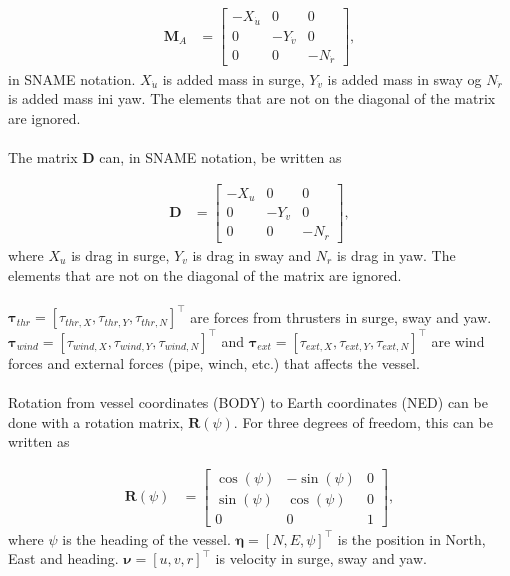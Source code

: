 \documentclass[a4paper]{article}
\begin{document}
\begin{equation}
\label{eq:MA_matrix}
\begin{aligned}
	\boldsymbol{M}_A &=
		\left[ \begin{array}{ccc}
			-X_{\dot{u}} &  0 & 0 \\
			0 &  -Y_{\dot{v}} & 0 \\
			0 & 0 &  -N_{\dot{r}} 
		\end{array} \right],
\end{aligned}
\end{equation}
%
in SNAME notation. $X_{\dot{u}}$ is added mass in surge, $Y_{\dot{v}}$ is added mass in sway og $N_{\dot{r}}$ is added mass ini yaw. The elements that are not on
the diagonal of the matrix are ignored.
\\
\\
The matrix $\boldsymbol{D}$ can, in SNAME notation, be written as

\begin{equation}
\label{eq:D_matrise}
\begin{aligned}
	\boldsymbol{D} &=
		\left[ \begin{array}{ccc}
			-X_u &  0 & 0 \\
			0 &  -Y_v & 0 \\
			0 & 0 &  -N_r 
		\end{array} \right],
\end{aligned}
\end{equation}
%
where $X_u$ is drag in surge, $Y_v$ is drag in sway and $N_r$ is drag in yaw. The elements that are not on the diagonal of the matrix are ignored.
\\
\\
$\boldsymbol{\tau}_{thr} = [\tau_{thr,X}, \tau_{thr,Y}, \tau_{thr,N}]^{\top}$ are forces from thrusters in surge, sway and yaw. 
$\boldsymbol{\tau}_{wind} = [\tau_{wind,X}, \tau_{wind,Y}, \tau_{wind,N}]^{\top}$ and $\boldsymbol{\tau}_{ext} =
 [\tau_{ext,X}, \tau_{ext,Y}, \tau_{ext,N}]^{\top}$ are wind forces and external forces (pipe, winch, etc.) that affects the vessel.
\\
\\
Rotation from vessel coordinates (BODY) to Earth coordinates (NED) can be done with a rotation matrix, $\boldsymbol{R}(\psi)$. For three degrees of freedom, this can be written as

\begin{equation}
\label{eq:rotation_matrix}
\begin{aligned}
	\boldsymbol{R}(\psi) &=
		\left[ \begin{array}{ccc}
			\cos(\psi) &  -\sin(\psi) & 0 \\
			\sin(\psi) &  \cos(\psi) & 0 \\
			0 & 0 &  1 
		\end{array} \right],
\end{aligned}
\end{equation}
%
where $\psi$ is the heading of the vessel. $\boldsymbol{\eta} = [N, E, \psi]^{\top}$ is the position in North, East and heading. $\boldsymbol{\nu} = [u, v, r]^{\top}$ 
is velocity in surge, sway and yaw.
\end{document}
